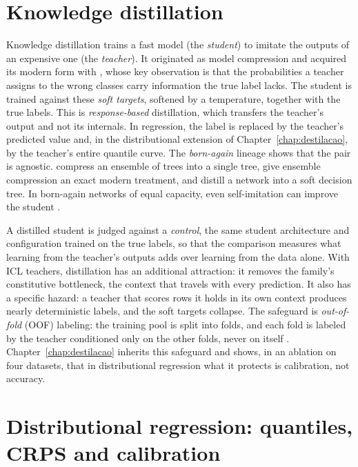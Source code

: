 \section{Knowledge distillation}
\label{sec:fund-destilacao}

Knowledge distillation trains a fast model (the \emph{student}) to
imitate the outputs of an expensive one (the \emph{teacher}). It
originated as model compression \citep{bucila2006} and acquired its
modern form with \citet{hinton2015}, whose key observation is that
the probabilities a teacher assigns to the wrong classes carry
information the true label lacks. The student is trained against
these \emph{soft targets}, softened by a temperature, together with
the true labels. This is \emph{response-based} distillation, which transfers the teacher's output and not its internals. In regression, the label is replaced by the teacher's predicted value and, in the distributional extension of Chapter~\ref{chap:destilacao}, by the teacher's entire quantile curve. The
\emph{born-again} lineage shows that the pair is agnostic. \citet{breiman1996} compress an
ensemble of trees into a single tree, \citet{vidal2020} give ensemble
compression an exact modern treatment, and \citet{frosst2017} distill
a network into a soft decision tree. In born-again networks of equal
capacity, even self-imitation can improve the student
\citep{furlanello2018}.

A distilled student is judged against a \emph{control}, the same student architecture and configuration trained on the
true labels, so that the comparison measures what learning from the
teacher's outputs adds over learning from the data alone. With ICL
teachers, distillation has an additional attraction: it removes the family's constitutive bottleneck, the context that
travels with every prediction. It also has a specific hazard: a teacher that scores rows it holds in its own context produces nearly deterministic labels, and the soft targets collapse. The safeguard is
\emph{out-of-fold} (OOF) labeling: the training pool is split into
folds, and each fold is labeled by the teacher conditioned only on
the other folds, never on itself \citep{pocketfm2026}.
Chapter~\ref{chap:destilacao} inherits this safeguard and shows, in
an ablation on four datasets, that in distributional regression what
it protects is calibration, not accuracy.

\section{Distributional regression: quantiles, CRPS and calibration}
\label{sec:fund-distribucional}

